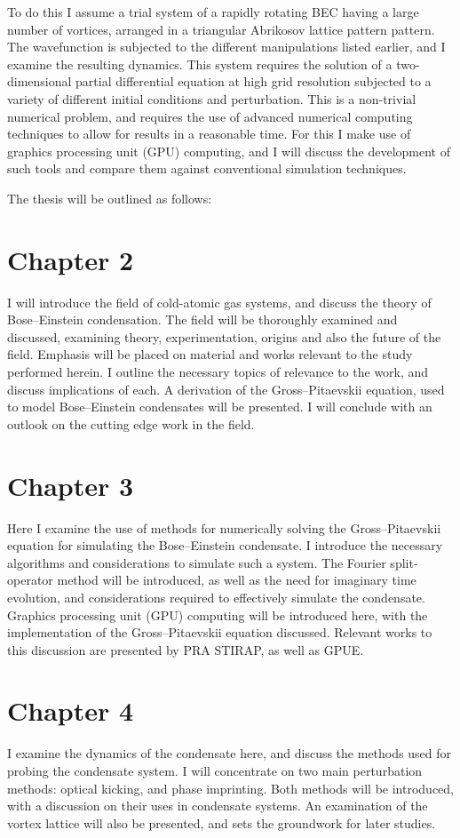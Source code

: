 To do this I assume a trial system of a rapidly rotating BEC having a large number of vortices, arranged in a triangular Abrikosov lattice pattern pattern. The wavefunction is subjected to the different manipulations listed earlier, and I examine the resulting dynamics. This system requires the solution of a two-dimensional partial differential equation at high grid resolution subjected to a variety of different initial conditions and perturbation. This is a non-trivial numerical problem, and requires the use of advanced numerical computing techniques to allow for results in a reasonable time. For this I make use of graphics processing unit (GPU) computing, and I will discuss the development of such tools and compare them against conventional simulation techniques.

The thesis will be outlined as follows:

\section{Chapter 2}
I will introduce the field of cold-atomic gas systems, and discuss the theory of Bose--Einstein condensation. The field will be thoroughly examined and discussed, examining theory, experimentation, origins and also the future of the field. Emphasis will be placed on material and works relevant to the study performed herein. I outline the necessary topics of relevance to the work, and discuss implications of each. A derivation of the Gross--Pitaevskii equation, used to model Bose--Einstein condensates will be presented. I will conclude with an outlook on the cutting edge work in the field.


\section{Chapter 3}
Here I examine the use of methods for numerically solving the Gross--Pitaevskii equation for simulating the Bose--Einstein condensate. I introduce the necessary algorithms and considerations to simulate such a system. The Fourier split-operator method will be introduced, as well as the need for imaginary time evolution, and considerations required to effectively simulate the condensate. Graphics processing unit (GPU) computing will be introduced here, with the implementation of the Gross--Pitaevskii equation discussed. Relevant works to this discussion are presented by PRA STIRAP, as well as GPUE.

\section{Chapter 4}
I examine the dynamics of the condensate here, and discuss the methods used for probing the condensate system. I will concentrate on two main perturbation methods: optical kicking, and phase imprinting. Both methods will be introduced, with a discussion on their uses in condensate systems. An examination of the vortex lattice will also be presented, and sets the groundwork for later studies.


